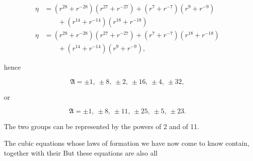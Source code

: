 \[ \begin{aligned}
\eta &= (r^{28} + r^{-28})(r^{27} + r^{-27}) + (r^7 + r^{-7})(r^9 + r^{-9}) \\
&\qquad + (r^{14} + r^{-14})(r^{18} + r^{-18}) \\
\eta &= (r^{28} + r^{-28})(r^{27} + r^{-27}) + (r^7 + r^{-7})(r^{18} + r^{-18}) \\
&\qquad + (r^{14} + r^{-14})(r^9 + r^{-9}),
\end{aligned} \]

hence

\[ \mathfrak{A} = \pm 1, \ \pm 8, \ \pm 2, \ \pm 16, \ \pm 4, \ \pm 32, \]

or

\[ \mathfrak{A} = \pm 1, \ \pm 8, \ \pm 11, \ \pm 25, \ \pm 5, \ \pm 23. \]

The two groups can be represented by the powers of 2 and of 11.

The cubic equations whose laws of formation we have now come to know
contain, together with their  But these equations are also all
